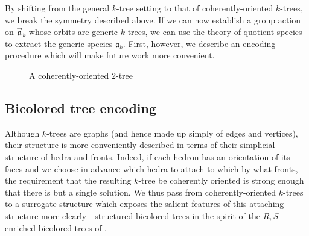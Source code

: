 \documentclass[sectionflow,singlespace,twoside,boldmathhdr]{brandiss} %
\numberwithin{section}{chapter}
\numberwithin{figure}{chapter}
\begin{document}
By shifting from the general $k$-tree setting to that of coherently-oriented $k$-trees, we break the symmetry described above.
If we can now establish a group action on $\vec{\mathfrak{a}}_{k}$ whose orbits are generic $k$-trees, we can use the theory of quotient species to extract the generic species $\mathfrak{a}_{k}$.
First, however, we describe an encoding procedure which will make future work more convenient.

\begin{figure}[htb]
  \centering
  \caption{A coherently-oriented $2$-tree}
  \label{fig:exco2tree}
\end{figure}

\subsection{Bicolored tree encoding}\label{ss:bctree}
Although $k$-trees are graphs (and hence made up simply of edges and vertices), their structure is more conveniently described in terms of their simplicial structure of hedra and fronts.
Indeed, if each hedron has an orientation of its faces and we choose in advance which hedra to attach to which by what fronts, the requirement that the resulting $k$-tree be coherently oriented is strong enough that there is but a single solution.
We thus pass from coherently-oriented $k$-trees to a surrogate structure which exposes the salient features of this attaching structure more clearly---structured bicolored trees in the spirit of the $R, S$-enriched bicolored trees of \cite[\S 3.2]{bll:species}.
\end{document}
